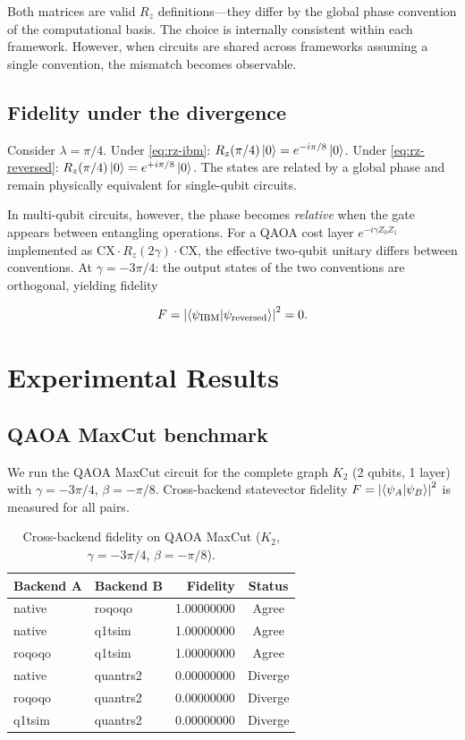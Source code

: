 \documentclass[11pt,a4paper]{article}
\begin{document}
Both matrices are valid $R_z$ definitions---they differ by the global phase
convention of the computational basis. The choice is internally consistent
within each framework. However, when circuits are shared across frameworks
assuming a single convention, the mismatch becomes observable.

\subsection{Fidelity under the divergence}

Consider $\lambda = \pi/4$. Under \cref{eq:rz-ibm}: $R_z(\pi/4)\ket{0} =
e^{-i\pi/8}\ket{0}$. Under \cref{eq:rz-reversed}: $R_z(\pi/4)\ket{0} =
e^{+i\pi/8}\ket{0}$. The states are related by a global phase and remain
physically equivalent for single-qubit circuits.

In multi-qubit circuits, however, the phase becomes \emph{relative} when the
gate appears between entangling operations. For a QAOA cost layer
$e^{-i\gamma Z_0 Z_1}$ implemented as $\mathrm{CX} \cdot R_z(2\gamma) \cdot \mathrm{CX}$,
the effective two-qubit unitary differs between conventions. At $\gamma = -3\pi/4$:
the output states of the two conventions are orthogonal, yielding fidelity

\begin{equation}
  F = \abs{\braket{\psi_{\mathrm{IBM}}}{\psi_{\mathrm{reversed}}}}^2 = 0.
\end{equation}

\section{Experimental Results}

\subsection{QAOA MaxCut benchmark}

We run the QAOA MaxCut circuit for the complete graph $K_2$ (2 qubits, 1 layer)
with $\gamma = -3\pi/4$, $\beta = -\pi/8$. Cross-backend statevector fidelity
$F = \abs{\braket{\psi_A}{\psi_B}}^2$ is measured for all pairs.

\begin{table}[h!]
\centering
\caption{Cross-backend fidelity on QAOA MaxCut ($K_2$, $\gamma=-3\pi/4$, $\beta=-\pi/8$).}
\label{tab:qaoa-fidelity}
\begin{tabular}{llrc}
\toprule
Backend A & Backend B & Fidelity & Status \\
\midrule
native   & roqoqo   & 1.00000000 & Agree \\
native   & q1tsim   & 1.00000000 & Agree \\
roqoqo   & q1tsim   & 1.00000000 & Agree \\
native   & quantrs2 & 0.00000000 & Diverge \\
roqoqo   & quantrs2 & 0.00000000 & Diverge \\
q1tsim   & quantrs2 & 0.00000000 & Diverge \\
\bottomrule
\end{tabular}
\end{table}
\end{document}
